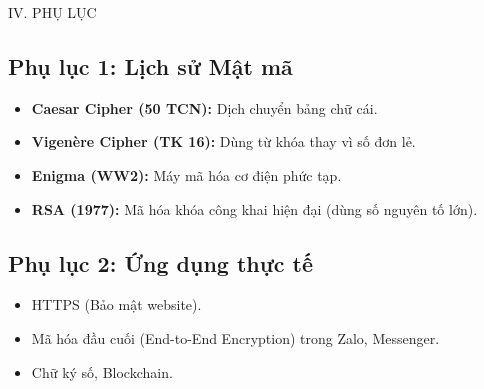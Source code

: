\documentclass[12pt,a4paper]{article}
\begin{document}
\newpage
\begin{sectionbox}{IV. PHỤ LỤC}
\subsection*{Phụ lục 1: Lịch sử Mật mã}
\begin{itemize}
    \item \textbf{Caesar Cipher (50 TCN):} Dịch chuyển bảng chữ cái.
    \item \textbf{Vigenère Cipher (TK 16):} Dùng từ khóa thay vì số đơn lẻ.
    \item \textbf{Enigma (WW2):} Máy mã hóa cơ điện phức tạp.
    \item \textbf{RSA (1977):} Mã hóa khóa công khai hiện đại (dùng số nguyên tố lớn).
\end{itemize}

\subsection*{Phụ lục 2: Ứng dụng thực tế}
\begin{itemize}
    \item HTTPS (Bảo mật website).
    \item Mã hóa đầu cuối (End-to-End Encryption) trong Zalo, Messenger.
    \item Chữ ký số, Blockchain.
\end{itemize}
\end{sectionbox}
\end{document}
